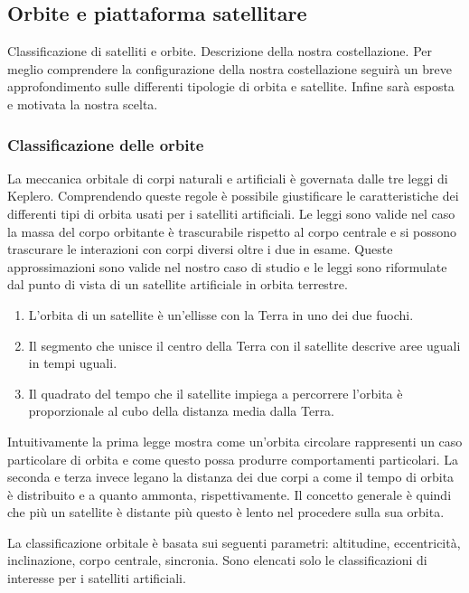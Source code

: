 \documentclass[a4paper]{article}
\begin{document}
		\subsection{Orbite e piattaforma satellitare}
		{\sc Classificazione di satelliti e orbite. Descrizione della nostra costellazione.}
		Per meglio comprendere la configurazione della nostra costellazione seguirà un breve approfondimento sulle differenti tipologie di orbita e satellite. Infine sarà esposta e motivata la nostra scelta.

			\subsubsection{Classificazione delle orbite}
			La meccanica orbitale di corpi naturali e artificiali è governata dalle tre leggi di Keplero. Comprendendo queste regole è possibile giustificare le caratteristiche dei differenti tipi di orbita usati per i satelliti artificiali. Le leggi sono valide nel caso la massa del corpo orbitante è trascurabile rispetto al corpo centrale e si possono trascurare le interazioni con corpi diversi oltre i due in esame. Queste approssimazioni sono valide nel nostro caso di studio e le leggi sono riformulate dal punto di vista di un satellite artificiale in orbita terrestre.
			\begin{enumerate}
				\item L'orbita di un satellite è un'ellisse con la Terra in uno dei due fuochi.
				\item Il segmento che unisce il centro della Terra con il satellite descrive aree uguali in tempi uguali.
				\item Il quadrato del tempo che il satellite impiega a percorrere l'orbita è proporzionale al cubo della distanza media dalla Terra.
			\end{enumerate}
			
			Intuitivamente la prima legge mostra come un'orbita circolare rappresenti un caso particolare di orbita e  come questo possa produrre comportamenti particolari. La seconda e terza invece legano la distanza dei due corpi a come il tempo di orbita è distribuito e a quanto ammonta, rispettivamente. Il concetto generale è quindi che più un satellite è distante più questo è lento nel procedere sulla sua orbita.
			
			La classificazione orbitale è basata sui seguenti parametri: altitudine, eccentricità, inclinazione, corpo centrale, sincronia. Sono elencati solo le classificazioni di interesse per i satelliti artificiali.
						
\end{document}
